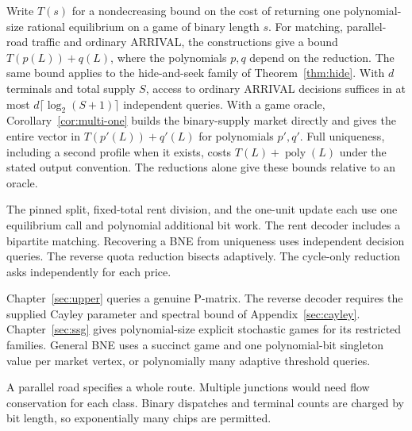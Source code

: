 \documentclass[11pt,oneside,openany,notitlepage]{report}
\begin{document}
Write \(T(s)\) for a nondecreasing bound on the cost of returning one
polynomial-size rational equilibrium on a game of binary length \(s\).
For matching, parallel-road traffic and ordinary ARRIVAL, the constructions
give a bound \(T(p(L))+q(L)\), where the polynomials \(p,q\) depend on the
reduction. The same bound applies to the hide-and-seek family of
Theorem~\ref{thm:hide}. With \(d\) terminals and total supply \(S\),
access to ordinary ARRIVAL decisions suffices in at most
\(d\lceil\log_2(S+1)\rceil\) independent queries. With a game oracle,
Corollary~\ref{cor:multi-one} builds the binary-supply market directly and
gives the entire vector in \(T(p'(L))+q'(L)\) for polynomials \(p',q'\).
Full uniqueness, including a second profile when it
exists, costs \(T(L)+\operatorname{poly}(L)\) under the stated output
convention. The reductions alone give these bounds relative to an oracle.


The pinned split, fixed-total rent division, and the one-unit update each
use one equilibrium call and polynomial additional bit work. The rent
decoder includes a bipartite matching. Recovering a BNE from uniqueness
uses independent decision queries. The reverse quota reduction bisects
adaptively. The cycle-only reduction asks independently for each price.

Chapter~\ref{sec:upper} queries a genuine P-matrix. The reverse decoder
requires the supplied Cayley parameter and spectral bound of
Appendix~\ref{sec:cayley}. Chapter~\ref{sec:ssg} gives polynomial-size
explicit stochastic games for its restricted families. General BNE uses
a succinct game and one polynomial-bit singleton value per market
vertex, or polynomially many adaptive threshold queries.

A parallel road specifies a whole route. Multiple junctions would need
flow conservation for each class. Binary dispatches and terminal counts
are charged by bit length, so exponentially many chips are permitted.
\end{document}
